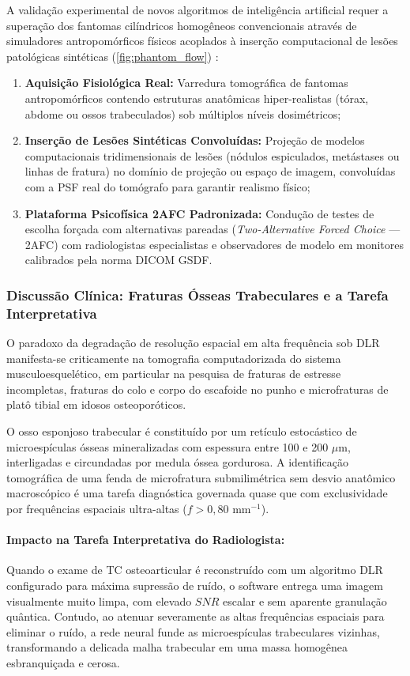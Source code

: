 \documentclass[
  12pt,
  a4paper,
  oneside
]{report}
\begin{document}
A validação experimental de novos algoritmos de inteligência artificial requer a superação dos fantomas cilíndricos homogêneos convencionais através de simuladores antropomórficos físicos acoplados à inserção computacional de lesões patológicas sintéticas (\cref{fig:phantom_flow}) \cite{racine2020, toia2023}:
\begin{enumerate}
  \item \textbf{Aquisição Fisiológica Real:} Varredura tomográfica de fantomas antropomórficos contendo estruturas anatômicas hiper-realistas (tórax, abdome ou ossos trabeculados) sob múltiplos níveis dosimétricos;
  \item \textbf{Inserção de Lesões Sintéticas Convoluídas:} Projeção de modelos computacionais tridimensionais de lesões (nódulos espiculados, metástases ou linhas de fratura) no domínio de projeção ou espaço de imagem, convoluídas com a PSF real do tomógrafo para garantir realismo físico;
  \item \textbf{Plataforma Psicofísica 2AFC Padronizada:} Condução de testes de escolha forçada com alternativas pareadas (\emph{Two-Alternative Forced Choice} --- 2AFC) com radiologistas especialistas e observadores de modelo em monitores calibrados pela norma DICOM GSDF.
\end{enumerate}

\subsubsection{Discussão Clínica: Fraturas Ósseas Trabeculares e a Tarefa Interpretativa}
O paradoxo da degradação de resolução espacial em alta frequência sob DLR manifesta-se criticamente na tomografia computadorizada do sistema musculoesquelético, em particular na pesquisa de fraturas de estresse incompletas, fraturas do colo e corpo do escafoide no punho e microfraturas de platô tibial em idosos osteoporóticos.

O osso esponjoso trabecular é constituído por um retículo estocástico de microespículas ósseas mineralizadas com espessura entre 100 e 200 $\mu\text{m}$, interligadas e circundadas por medula óssea gordurosa. A identificação tomográfica de uma fenda de microfratura submilimétrica sem desvio anatômico macroscópico é uma tarefa diagnóstica governada quase que com exclusividade por frequências espaciais ultra-altas ($f > 0{,}80\text{ mm}^{-1}$).

\paragraph{Impacto na Tarefa Interpretativa do Radiologista:} Quando o exame de TC osteoarticular é reconstruído com um algoritmo DLR configurado para máxima supressão de ruído, o software entrega uma imagem visualmente muito limpa, com elevado $SNR$ escalar e sem aparente granulação quântica. Contudo, ao atenuar severamente as altas frequências espaciais para eliminar o ruído, a rede neural funde as microespículas trabeculares vizinhas, transformando a delicada malha trabecular em uma massa homogênea esbranquiçada e cerosa. 
\end{document}
